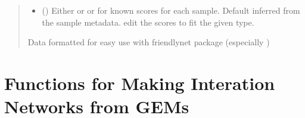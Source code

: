 \documentclass[letterpaper,10pt,english]{sphinxmanual}
\begin{document}
\begin{fulllineitems}
\begin{quote}
\begin{description}
\begin{itemize}
\item {} 
\sphinxAtStartPar
{} () \textendash{} Either  or  or  for known scores for each sample. Default inferred from the sample metadata.  edit the scores to fit the given type.

\end{itemize}

\sphinxAtStartPar
Data formatted for easy use with friendlynet package (especially {\hyperref[\detokenize{scoring:score_net.score_net}]{}})

\end{description}\end{quote}

\end{fulllineitems}


\sphinxstepscope


\chapter{Functions for Making Interation Networks from GEMs}
\label{\detokenize{network_build:functions-for-making-interation-networks-from-gems}}\label{\detokenize{network_build::doc}}
\end{document}
